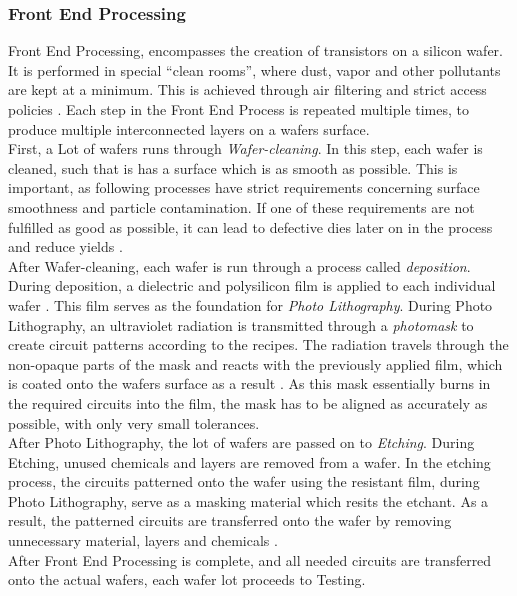 \documentclass{Academic}
\begin{document}
    \subsubsection{Front End Processing}
    Front End Processing, encompasses the creation of transistors on a silicon wafer. It is performed in special \enquote{clean rooms}, where dust, vapor and other pollutants are kept at a minimum. This is achieved through air filtering and strict access policies \cite{susto_automatic_2012}. Each step in the Front End Process is repeated multiple times, to produce multiple interconnected layers on a wafers surface. \\
    First, a Lot of wafers runs through \textit{Wafer-cleaning}. In this step, each wafer is cleaned, such that is has a surface which is as smooth as possible. This is important, as following processes have strict requirements concerning surface smoothness and particle contamination. If one of these requirements are not fulfilled as good as possible, it can lead to defective dies later on in the process and reduce yields \cite{susto_automatic_2012}.\\
    After Wafer-cleaning, each wafer is run through a process called \textit{deposition}. During deposition, a dielectric and polysilicon film is applied to each individual wafer \cite{susto_automatic_2012}. This film serves as the foundation for \textit{Photo Lithography}. During Photo Lithography, an ultraviolet radiation is transmitted through a \textit{photomask} to create circuit patterns according to the recipes. The radiation travels through the non-opaque parts of the mask and reacts with the previously applied film, which is coated onto the wafers surface as a result \cite{susto_automatic_2012}. As this mask essentially burns in the required circuits into the film, the mask has to be aligned as accurately as possible, with only very small tolerances.\\
    After Photo Lithography, the lot of wafers are passed on to \textit{Etching}. During Etching, unused chemicals and layers are removed from a wafer. In the etching process, the circuits patterned onto the wafer using the resistant film, during Photo Lithography, serve as a masking material which resits the etchant. As a result, the patterned circuits are transferred onto the wafer by removing unnecessary material, layers and chemicals \cite{susto_automatic_2012}.\\
    After Front End Processing is complete, and all needed circuits are transferred onto the actual wafers, each wafer lot proceeds to Testing.
\end{document}
